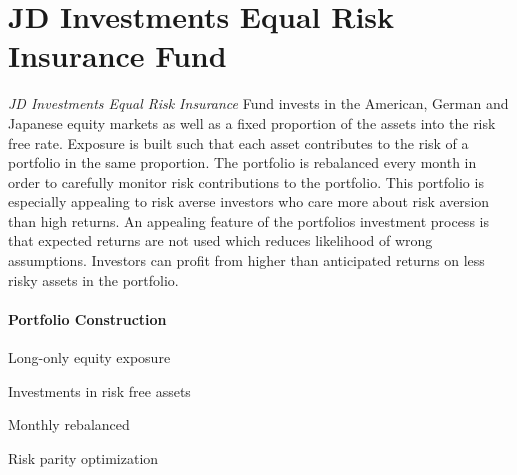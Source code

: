 \documentclass[11pt, parskip=full, DIV=14]{scrreprt}
\begin{document}
\newpage\section*{JD Investments Equal Risk Insurance Fund}
\textit{JD Investments Equal Risk Insurance} Fund invests in the American, German and Japanese equity markets as well as a fixed proportion of the assets into the risk free rate.
Exposure is built such that each asset contributes to the risk of a portfolio in the same proportion.
The portfolio is rebalanced every month in order to carefully monitor risk contributions to the portfolio.
This portfolio is especially appealing to risk averse investors who care more about risk aversion than high returns.
An appealing feature of the portfolios investment process is that expected returns are not used which reduces likelihood of wrong assumptions.
Investors can profit from higher than anticipated returns on less risky assets in the portfolio.
 

\paragraph{Portfolio Construction}
\begin{sit}
\item	Long-only equity exposure
\item	Investments in risk free assets
\item	Monthly rebalanced
\item	Risk parity optimization
\end{sit}

\begin{figure}[H]
\end{figure}
\end{document}
